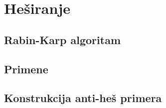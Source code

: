 \section{He\v siranje}

\subsection{Rabin-Karp algoritam}

\subsection{Primene}

\subsection{Konstrukcija anti-he\v s primera}